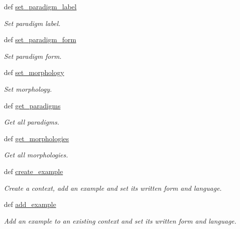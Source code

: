 \begin{DoxyCompactItemize}
def \hyperlink{classlmf_1_1src_1_1core_1_1lexical__entry_1_1_lexical_entry_af2b23a5d39e9bddddf4da1a971d6928c}{set\+\_\+paradigm\+\_\+label}
\begin{DoxyCompactList}\small\item\em Set paradigm label. \end{DoxyCompactList}\item 
def \hyperlink{classlmf_1_1src_1_1core_1_1lexical__entry_1_1_lexical_entry_ad991d3a24dea50c4d793b3c947fa9037}{set\+\_\+paradigm\+\_\+form}
\begin{DoxyCompactList}\small\item\em Set paradigm form. \end{DoxyCompactList}\item 
def \hyperlink{classlmf_1_1src_1_1core_1_1lexical__entry_1_1_lexical_entry_ac4b0c5f22daeba6c9cb445e80c8245e4}{set\+\_\+morphology}
\begin{DoxyCompactList}\small\item\em Set morphology. \end{DoxyCompactList}\item 
def \hyperlink{classlmf_1_1src_1_1core_1_1lexical__entry_1_1_lexical_entry_ae87d1a773737190fba2a22330b886472}{get\+\_\+paradigms}
\begin{DoxyCompactList}\small\item\em Get all paradigms. \end{DoxyCompactList}\item 
def \hyperlink{classlmf_1_1src_1_1core_1_1lexical__entry_1_1_lexical_entry_a18ba5dfe76ff71f23635aff3b2d5560f}{get\+\_\+morphologies}
\begin{DoxyCompactList}\small\item\em Get all morphologies. \end{DoxyCompactList}\item 
def \hyperlink{classlmf_1_1src_1_1core_1_1lexical__entry_1_1_lexical_entry_a8de47b684e09a774bd97be2cd98a2b68}{create\+\_\+example}
\begin{DoxyCompactList}\small\item\em Create a context, add an example and set its written form and language. \end{DoxyCompactList}\item 
def \hyperlink{classlmf_1_1src_1_1core_1_1lexical__entry_1_1_lexical_entry_acfdd422522c23eb7073da59ce09c764d}{add\+\_\+example}
\begin{DoxyCompactList}\small\item\em Add an example to an existing context and set its written form and language. \end{DoxyCompactList}\item 

\end{DoxyCompactItemize}
